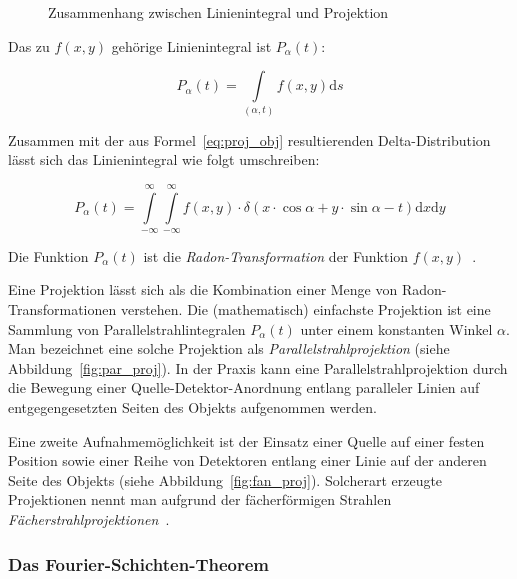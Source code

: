 \begin{figure}[!htb]
\caption{Zusammenhang zwischen Linienintegral und Projektion}
\label{fig:math_proj}
\end{figure}

Das zu $f(x, y)$ gehörige Linienintegral ist $P_{\alpha}(t)$:

\begin{equation}\label{eq:proj_int}
    P_{\alpha}(t) = \int\limits_{(\alpha, t)} f(x, y) \mathrm{d}s
\end{equation}

Zusammen mit der aus Formel~\ref{eq:proj_obj} resultierenden Delta-Distribution lässt sich das Linienintegral wie folgt
umschreiben:

\begin{equation}\label{eq:proj_radon}
    P_{\alpha}(t) = \int\limits_{-\infty}^{\infty}\int\limits_{-\infty}^{\infty}f(x, y) \cdot \delta(x \cdot
                    \cos \alpha + y \cdot \sin \alpha - t) \mathrm{d}x \mathrm{d}y
\end{equation}

Die Funktion $P_{\alpha}(t)$ ist die \textit{Radon-Transformation} der Funktion $f(x, y)$~\cite{radon}.

Eine Projektion lässt sich als die Kombination einer Menge von Radon-Transformationen verstehen. Die
(mathematisch) einfachste Projektion ist eine Sammlung von Parallelstrahlintegralen $P_{\alpha}(t)$ unter einem
konstanten Winkel $\alpha$. Man bezeichnet eine solche Projektion als \textit{Parallelstrahlprojektion} (siehe
Abbildung~\ref{fig:par_proj}). In der Praxis kann eine Parallelstrahlprojektion durch die Bewegung einer
Quelle-Detektor-Anordnung entlang paralleler Linien auf entgegengesetzten Seiten des Objekts aufgenommen werden.

Eine zweite Aufnahmemöglichkeit ist der Einsatz einer Quelle auf einer festen Position sowie einer Reihe von Detektoren
entlang einer Linie auf der anderen Seite des Objekts (siehe Abbildung~\ref{fig:fan_proj}). Solcherart erzeugte
Projektionen nennt man aufgrund der fächerförmigen Strahlen \textit{Fächerstrahlprojektionen}~\cite{kakslan}.

\subsubsection{Das Fourier-Schichten-Theorem}

